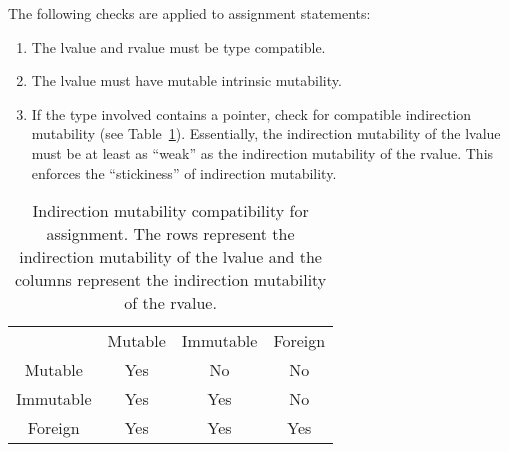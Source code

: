 
The following checks are applied to assignment statements:
\begin{enumerate}
\item The lvalue and rvalue must be type compatible.
\item The lvalue must have mutable intrinsic mutability.
\item If the type involved contains a pointer, check for compatible indirection mutability (see Table~\ref{assignmut}).
  Essentially, the indirection mutability of the lvalue must be at least as ``weak'' as the indirection mutability of the rvalue.
  This enforces the ``stickiness'' of indirection mutability.
\end{enumerate}


\begin{table}[H]
  \centering
  \begin{tabular}{cccc}
              & Mutable & Immutable & Foreign \\
    Mutable   & Yes     & No        & No      \\
    Immutable & Yes     & Yes       & No      \\
    Foreign   & Yes     & Yes       & Yes     \\
    \end{tabular}
  \caption[Indirection mutability compatibility for assignment]{Indirection mutability compatibility for assignment.  The rows represent the indirection mutability of the lvalue and the columns represent the indirection mutability of the rvalue.\label{assignmut}}
\end{table}

